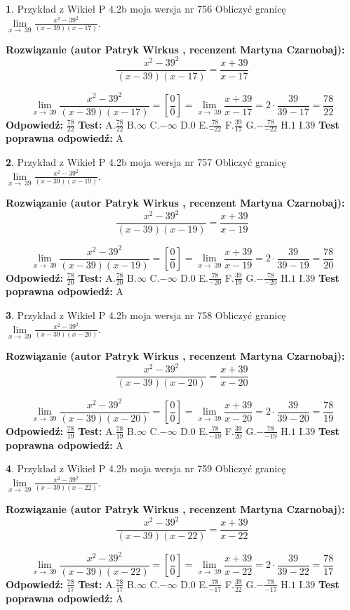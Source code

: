 \documentclass[12pt, a4paper]{article}
\theoremstyle{definition} %
\newtheorem{zad}{}
\newcommand{\zadStart}[1]{\begin{zad}#1\newline}
\newcommand{\zadStop}{\end{zad}}
\newcommand{\rozwStart}[2]{\noindent \textbf{Rozwiązanie (autor #1 , recenzent #2): }\newline}
\newcommand{\rozwStop}{\newline}
\newcommand{\odpStart}{\noindent \textbf{Odpowiedź:}\newline}
\newcommand{\odpStop}{\newline}
\newcommand{\testStart}{\noindent \textbf{Test:}\newline}
\newcommand{\testStop}{\newline}
\newcommand{\kluczStart}{\noindent \textbf{Test poprawna odpowiedź:}\newline}
\newcommand{\kluczStop}{\newline}
\begin{document}
\zadStart{Przykład z Wikieł P 4.2b moja wersja nr 756}
Obliczyć granicę $\lim\limits_{x\to\ 39}\frac{x^{2}-39^{2}}{(x-39)(x-17)}$.
\zadStop
\rozwStart{Patryk Wirkus}{Martyna Czarnobaj}
$$\frac{x^{2}-39^{2}}{(x-39)(x-17)}=\frac{x+39}{x-17}$$

$$\lim\limits_{x\to\ 39}\frac{x^{2}-39^{2}}{(x-39)(x-17)}=[\frac{0}{0}]=\lim\limits_{x\to\ 39}\frac{x+39}{x-17}=2 \cdot \frac{39}{39-17} = \frac{78}{22}$$
\rozwStop
\odpStart
$\frac{78}{22}$
\odpStop
\testStart
A.$\frac{78}{22}$
B.$\infty$
C.$-\infty$
D.$0$
E.$\frac{78}{-22}$
F.$\frac{39}{17}$
G.$-\frac{78}{-22}$
H.$1$
I.$39$
\testStop
\kluczStart
A
\kluczStop



\zadStart{Przykład z Wikieł P 4.2b moja wersja nr 757}
Obliczyć granicę $\lim\limits_{x\to\ 39}\frac{x^{2}-39^{2}}{(x-39)(x-19)}$.
\zadStop
\rozwStart{Patryk Wirkus}{Martyna Czarnobaj}
$$\frac{x^{2}-39^{2}}{(x-39)(x-19)}=\frac{x+39}{x-19}$$

$$\lim\limits_{x\to\ 39}\frac{x^{2}-39^{2}}{(x-39)(x-19)}=[\frac{0}{0}]=\lim\limits_{x\to\ 39}\frac{x+39}{x-19}=2 \cdot \frac{39}{39-19} = \frac{78}{20}$$
\rozwStop
\odpStart
$\frac{78}{20}$
\odpStop
\testStart
A.$\frac{78}{20}$
B.$\infty$
C.$-\infty$
D.$0$
E.$\frac{78}{-20}$
F.$\frac{39}{19}$
G.$-\frac{78}{-20}$
H.$1$
I.$39$
\testStop
\kluczStart
A
\kluczStop



\zadStart{Przykład z Wikieł P 4.2b moja wersja nr 758}
Obliczyć granicę $\lim\limits_{x\to\ 39}\frac{x^{2}-39^{2}}{(x-39)(x-20)}$.
\zadStop
\rozwStart{Patryk Wirkus}{Martyna Czarnobaj}
$$\frac{x^{2}-39^{2}}{(x-39)(x-20)}=\frac{x+39}{x-20}$$

$$\lim\limits_{x\to\ 39}\frac{x^{2}-39^{2}}{(x-39)(x-20)}=[\frac{0}{0}]=\lim\limits_{x\to\ 39}\frac{x+39}{x-20}=2 \cdot \frac{39}{39-20} = \frac{78}{19}$$
\rozwStop
\odpStart
$\frac{78}{19}$
\odpStop
\testStart
A.$\frac{78}{19}$
B.$\infty$
C.$-\infty$
D.$0$
E.$\frac{78}{-19}$
F.$\frac{39}{20}$
G.$-\frac{78}{-19}$
H.$1$
I.$39$
\testStop
\kluczStart
A
\kluczStop



\zadStart{Przykład z Wikieł P 4.2b moja wersja nr 759}
Obliczyć granicę $\lim\limits_{x\to\ 39}\frac{x^{2}-39^{2}}{(x-39)(x-22)}$.
\zadStop
\rozwStart{Patryk Wirkus}{Martyna Czarnobaj}
$$\frac{x^{2}-39^{2}}{(x-39)(x-22)}=\frac{x+39}{x-22}$$

$$\lim\limits_{x\to\ 39}\frac{x^{2}-39^{2}}{(x-39)(x-22)}=[\frac{0}{0}]=\lim\limits_{x\to\ 39}\frac{x+39}{x-22}=2 \cdot \frac{39}{39-22} = \frac{78}{17}$$
\rozwStop
\odpStart
$\frac{78}{17}$
\odpStop
\testStart
A.$\frac{78}{17}$
B.$\infty$
C.$-\infty$
D.$0$
E.$\frac{78}{-17}$
F.$\frac{39}{22}$
G.$-\frac{78}{-17}$
H.$1$
I.$39$
\testStop
\kluczStart
A
\kluczStop
\end{document}
